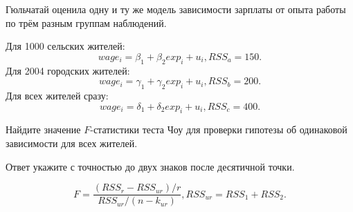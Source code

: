 
\begin{question}
Гюльчатай оценила одну и ту же модель зависимости зарплаты от опыта работы по трём разным группам наблюдений.

Для 1000 сельских жителей:
\[
wage_i = \beta_1 + \beta_2 exp_i + u_i, RSS_a = 150.
\]
Для 2004 городских жителей:
\[
wage_i = \gamma_1 + \gamma_2 exp_i + u_i, RSS_b = 200.
\]
Для всех жителей сразу:
\[
wage_i = \delta_1 + \delta_2 exp_i + u_i, RSS_c = 400.
\]

Найдите значение \(F\)-статистики теста Чоу для проверки гипотезы об одинаковой зависимости для всех жителей.

Ответ укажите с точностью до двух знаков после десятичной точки.
\end{question}

\begin{solution}
\[
F = \frac{(RSS_r - RSS_{ur}) / r}{RSS_{ur} / (n - k_{ur})}, RSS_{ur} = RSS_1 + RSS_2.
\]
\end{solution}

